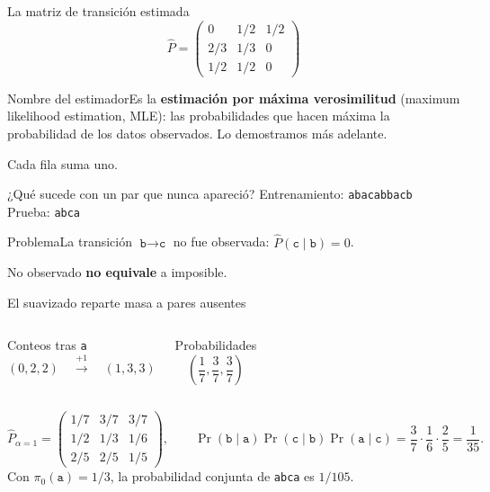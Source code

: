 \documentclass[aspectratio=169,10pt]{beamer}
\begin{document}
\begin{frame}{La matriz de transición estimada}
\[\widehat P=\begin{pmatrix}0&1/2&1/2\\2/3&1/3&0\\1/2&1/2&0\end{pmatrix}\]
\begin{block}{Nombre del estimador}Es la \textbf{estimación por máxima verosimilitud} (maximum likelihood estimation, MLE): las probabilidades que hacen máxima la probabilidad de los datos observados. Lo demostramos más adelante.\end{block}
\small Cada fila suma uno.
\end{frame}

\begin{frame}{¿Qué sucede con un par que nunca apareció?}
\centering\Large Entrenamiento: \texttt{abacabbacb}\\[5mm]
Prueba: \texttt{abca}\\[5mm]
\begin{alertblock}{Problema}\centering La transición $\texttt{b}\to\texttt{c}$ no fue observada: $\widehat P(\texttt{c}\mid\texttt{b})=0$.\end{alertblock}
\normalsize No observado \textbf{no equivale} a imposible.
\end{frame}

\begin{frame}{El suavizado reparte masa a pares ausentes}
\begin{columns}\begin{block}{Conteos tras \texttt{a}}\[(0,2,2)\quad\stackrel{+1}{\longrightarrow}\quad(1,3,3)\]\end{block}
\begin{block}{Probabilidades}\[\left(\frac17,\frac37,\frac37\right)\]\end{block}\end{columns}
\vspace{3mm}\[\widehat P_{\alpha=1}=\begin{pmatrix}1/7&3/7&3/7\\1/2&1/3&1/6\\2/5&2/5&1/5\end{pmatrix},\qquad
\Pr(\texttt{b}\mid\texttt{a})\Pr(\texttt{c}\mid\texttt{b})\Pr(\texttt{a}\mid\texttt{c})=\frac37\cdot\frac16\cdot\frac25=\frac1{35}.\]
\small Con $\pi_0(\texttt{a})=1/3$, la probabilidad conjunta de \texttt{abca} es $1/105$.
\end{frame}
\end{document}
